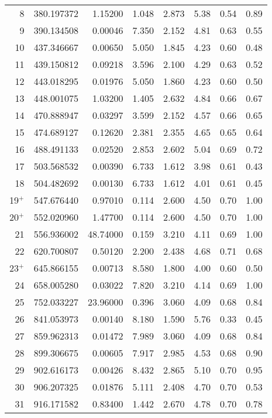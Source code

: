 {\begin{longtable}{rrrrrrrr}
8      & 380.197372 & 1.15200 & 1.048 & 2.873 & 5.38 & 0.54 & 0.89 \\
9      & 390.134508 & 0.00046 & 7.350 & 2.152 & 4.81 & 0.63 & 0.55 \\
10     & 437.346667 & 0.00650 & 5.050 & 1.845 & 4.23 & 0.60 & 0.48 \\
11     & 439.150812 & 0.09218 & 3.596 & 2.100 & 4.29 & 0.63 & 0.52 \\
12     & 443.018295 & 0.01976 & 5.050 & 1.860 & 4.23 & 0.60 & 0.50 \\
13     & 448.001075 & 1.03200 & 1.405 & 2.632 & 4.84 & 0.66 & 0.67 \\
14     & 470.888947 & 0.03297 & 3.599 & 2.152 & 4.57 & 0.66 & 0.65 \\
15     & 474.689127 & 0.12620 & 2.381 & 2.355 & 4.65 & 0.65 & 0.64 \\
16     & 488.491133 & 0.02520 & 2.853 & 2.602 & 5.04 & 0.69 & 0.72 \\
17     & 503.568532 & 0.00390 & 6.733 & 1.612 & 3.98 & 0.61 & 0.43 \\
18     & 504.482692 & 0.00130 & 6.733 & 1.612 & 4.01 & 0.61 & 0.45 \\
19$^+$ & 547.676440 & 0.97010 & 0.114 & 2.600 & 4.50 & 0.70 & 1.00 \\
20$^+$ & 552.020960 & 1.47700 & 0.114 & 2.600 & 4.50 & 0.70 & 1.00 \\
21     & 556.936002 & 48.74000& 0.159 & 3.210 & 4.11 & 0.69 & 1.00 \\
22     & 620.700807 & 0.50120 & 2.200 & 2.438 & 4.68 & 0.71 & 0.68 \\
23$^+$ & 645.866155 & 0.00713 & 8.580 & 1.800 & 4.00 & 0.60 & 0.50 \\
24     & 658.005280 & 0.03022 & 7.820 & 3.210 & 4.14 & 0.69 & 1.00 \\
25     & 752.033227 & 23.96000& 0.396 & 3.060 & 4.09 & 0.68 & 0.84 \\
26     & 841.053973 & 0.00140 & 8.180 & 1.590 & 5.76 & 0.33 & 0.45 \\
27     & 859.962313 & 0.01472 & 7.989 & 3.060 & 4.09 & 0.68 & 0.84 \\
28     & 899.306675 & 0.00605 & 7.917 & 2.985 & 4.53 & 0.68 & 0.90 \\
29     & 902.616173 & 0.00426 & 8.432 & 2.865 & 5.10 & 0.70 & 0.95 \\
30     & 906.207325 & 0.01876 & 5.111 & 2.408 & 4.70 & 0.70 & 0.53 \\
31     & 916.171582 & 0.83400 & 1.442 & 2.670 & 4.78 & 0.70 & 0.78 \\

\end{longtable}}

